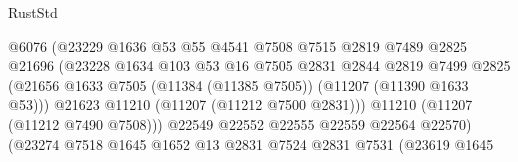 \begin{lexlean}{RustStd}
\begin{coremodule}
                                          @6076
                                          (@23229
                                            @1636
                                            @53
                                            @55
                                            @4541
                                            @7508
                                            @7515
                                            @2819
                                            @7489
                                            @2825
                                            @21696
                                            (@23228
                                              @1634
                                              @103
                                              @53
                                              @16
                                              @7505
                                              @2831
                                              @2844
                                              @2819
                                              @7499
                                              @2825
                                              (@21656
                                                @1633
                                                @7505
                                                (@11384 (@11385 @7505))
                                                (@11207 (@11390 @1633 @53)))
                                              @21623
                                              @11210
                                              (@11207 (@11212 @7500 @2831)))
                                            @11210
                                            (@11207 (@11212 @7490 @7508)))
                                          @22549
                                          @22552
                                          @22555
                                          @22559
                                          @22564
                                          @22570)
                                        (@23274
                                          @7518
                                          @1645
                                          @1652
                                          @13
                                          @2831
                                          @7524
                                          @2831
                                          @7531
                                          (@23619
                                            @1645

\end{coremodule}
\end{lexlean}
